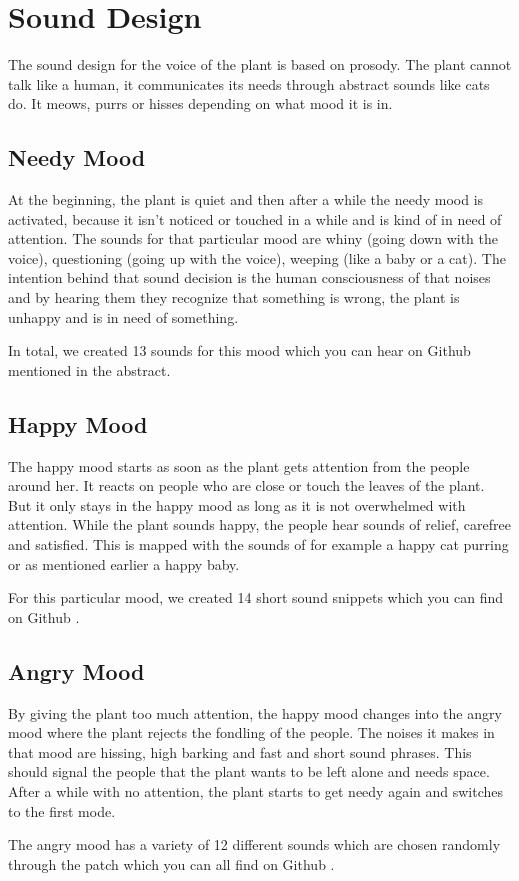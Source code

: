 \section{Sound Design}


The sound design for the voice of the plant is based on prosody. The plant cannot talk like a human, it communicates its needs through abstract sounds like cats do. It meows, purrs or hisses depending on what mood it is in.


\subsection{Needy Mood}
At the beginning, the plant is quiet and then after a while the needy mood is activated, because it isn't noticed or touched in a while and is kind of in need of attention. The sounds for that particular mood are whiny (going down with the voice), questioning (going up with the voice), weeping (like a baby or a cat). The intention behind that sound decision is the human consciousness of that noises and by hearing them they recognize that something is wrong, the plant is unhappy and is in need of something.  

In total, we created 13 sounds for this mood which you can hear on Github \cite{github} mentioned in the abstract. 



\subsection{Happy Mood}
The happy mood starts as soon as the plant gets attention from the people around her. It reacts on people who are close or touch the leaves of the plant. But it only stays in the happy mood as long as it is not overwhelmed with attention. While the plant sounds happy, the people hear sounds of relief, carefree and satisfied. This is mapped with the sounds of for example a happy cat purring  or as mentioned earlier a happy baby. 

For this particular mood, we created 14 short sound snippets which you can find on  Github \cite{github}.



\subsection{Angry Mood}

By giving the plant too much attention, the happy mood changes into the angry mood where the plant rejects the fondling of the people. The noises it makes in that mood are hissing, high barking and  fast and short sound phrases. This should signal the people that the  plant wants to be left alone and needs space. 
After a while with no attention, the plant starts to get needy again and switches to the first mode.

The angry mood has a variety of 12 different sounds which are chosen randomly through the patch which you can all find on  Github \cite{github}.
